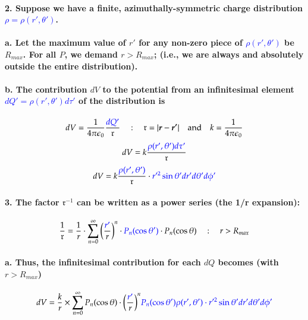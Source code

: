 \documentclass{article}
\begin{document}
\paragraph{2. Suppose we have a finite, azimuthally-symmetric charge distribution \textcolor{blue}{$\rho=\rho(r',\theta')$}.}
\paragraph{\indent a. Let the maximum value of $r'$ for any non-zero piece of \textcolor{blue}{$\rho(r',\theta')$} be $R_{max}$. For all $P$, we demand $r>R_{max}$; (i.e., we are always and absolutely outside the entire distribution).}
\paragraph{\indent b. The contribution $dV$ to the potential from an infinitesimal element \textcolor{blue}{$dQ'=\rho(r',\theta')d\tau'$} of the distribution is}
\begin{equation*}
    dV=\frac{1}{4\pi\epsilon_0}\frac{\textcolor{blue}{dQ'}}{\mathfrak{r}}\quad:\quad \mathfrak{r}=|\boldsymbol{r}-\boldsymbol{r'}|\quad \text{and}\quad k=\frac{1}{4\pi\epsilon_0}
\end{equation*}
\begin{equation*}
    dV=k\frac{\textcolor{blue}{\rho(r',\theta')d\tau'}}{\mathfrak{r}}
\end{equation*}
\begin{equation*}
    dV=k\frac{\textcolor{blue}{\rho(r',\theta')}}{\mathfrak{r}}\cdot\textcolor{blue}{r'^2\sin\theta'dr'd\theta'd\phi'}
\end{equation*}
\paragraph{3. The factor $\mathfrak{r}^{-1}$ can be written as a power series (the 1/r expansion):}
\begin{equation*}
    \frac{1}{\mathfrak{r}}=\frac{1}{r}\cdot\sum_{n=0}^{\infty}\bigg(\frac{\textcolor{blue}{r'}}{r}\bigg)^n\cdot \textcolor{blue}{P_n(\cos\theta')}\cdot P_n(\cos\theta) \quad:\quad r>R_{max}
\end{equation*}
\paragraph{\indent a. Thus, the infinitesimal contribution for each $dQ$ becomes (with $r>R_{max}$)}
\begin{equation*}
    dV=\frac{k}{r}\times\sum_{n=0}^{\infty}P_n(\cos\theta)\cdot\bigg(\frac{\textcolor{blue}{r'}}{r}\bigg)^n\textcolor{blue}{P_n(\cos\theta')\rho(r',\theta')\cdot r'^2\sin\theta'dr'd\theta'd\phi'}
\end{equation*}
\end{document}
